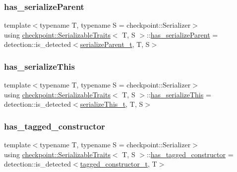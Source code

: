 \subsubsection{\texorpdfstring{has\+\_\+serialize\+Parent}{has\_serializeParent}}
{\footnotesize\ttfamily template$<$typename T, typename S = checkpoint\+::\+Serializer$>$ \\
using \hyperlink{structcheckpoint_1_1_serializable_traits}{checkpoint\+::\+Serializable\+Traits}$<$ T, S $>$\+::\hyperlink{structcheckpoint_1_1_serializable_traits_a4785b7f54369ec889ac5a25a8256a578}{has\+\_\+serialize\+Parent} =  detection\+::is\+\_\+detected$<$\hyperlink{structcheckpoint_1_1_serializable_traits_a38585e5b9aa0653c08ff48504e922ad5}{serialize\+Parent\+\_\+t}, T, S$>$}

\mbox{\label{structcheckpoint_1_1_serializable_traits_adc99520813c22cf61ab70ba2fea3cdc6}} 
\subsubsection{\texorpdfstring{has\+\_\+serialize\+This}{has\_serializeThis}}
{\footnotesize\ttfamily template$<$typename T, typename S = checkpoint\+::\+Serializer$>$ \\
using \hyperlink{structcheckpoint_1_1_serializable_traits}{checkpoint\+::\+Serializable\+Traits}$<$ T, S $>$\+::\hyperlink{structcheckpoint_1_1_serializable_traits_adc99520813c22cf61ab70ba2fea3cdc6}{has\+\_\+serialize\+This} =  detection\+::is\+\_\+detected$<$\hyperlink{structcheckpoint_1_1_serializable_traits_ac81eb64532a65d97dc995e582ef708ad}{serialize\+This\+\_\+t}, T, S$>$}

\mbox{\label{structcheckpoint_1_1_serializable_traits_a3388d17f4748bf899e063b3d05e0dbe4}} 
\subsubsection{\texorpdfstring{has\+\_\+tagged\+\_\+constructor}{has\_tagged\_constructor}}
{\footnotesize\ttfamily template$<$typename T, typename S = checkpoint\+::\+Serializer$>$ \\
using \hyperlink{structcheckpoint_1_1_serializable_traits}{checkpoint\+::\+Serializable\+Traits}$<$ T, S $>$\+::\hyperlink{structcheckpoint_1_1_serializable_traits_a3388d17f4748bf899e063b3d05e0dbe4}{has\+\_\+tagged\+\_\+constructor} =  detection\+::is\+\_\+detected$<$\hyperlink{structcheckpoint_1_1_serializable_traits_a5a1f289a5008468335f22e288a96d861}{tagged\+\_\+constructor\+\_\+t}, T$>$}

